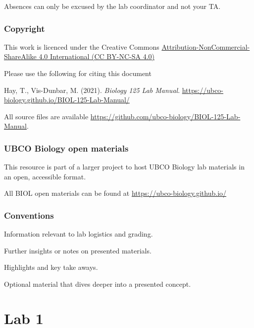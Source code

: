 \documentclass[
]{book}
\begin{document}
Absences can only be excused by the lab coordinator and not your TA.

\hypertarget{copyright}{%
\section*{Copyright}\label{copyright}}

This work is licenced under the Creative Commons \href{https://creativecommons.org/licenses/by-nc-sa/4.0/}{Attribution-NonCommercial-ShareAlike 4.0 International (CC BY-NC-SA 4.0)}

Please use the following for citing this document

Hay, T., Vis-Dunbar, M. (2021). \emph{Biology 125 Lab Manual}. \url{https://ubco-biology.github.io/BIOL-125-Lab-Manual/}

All source files are available \url{https://github.com/ubco-biology/BIOL-125-Lab-Manual}.

\hypertarget{ubco-biology-open-materials}{%
\section*{UBCO Biology open materials}\label{ubco-biology-open-materials}}

This resource is part of a larger project to host UBCO Biology lab materials in an open, accessible format.

All BIOL open materials can be found at \url{https://ubco-biology.github.io/}

\hypertarget{conventions}{%
\section*{Conventions}\label{conventions}}

Information relevant to lab logistics and grading.

Further insights or notes on presented materials.

Highlights and key take aways.

Optional material that dives deeper into a presented concept.

\hypertarget{part-lab-1}{%
\part*{Lab 1}\label{part-lab-1}}
\end{document}
